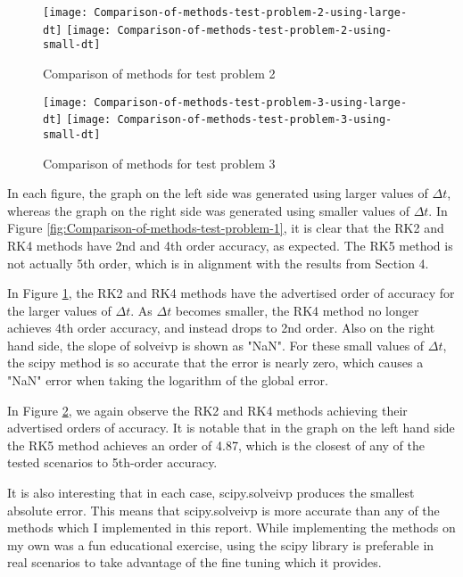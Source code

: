 \documentclass{article}
\begin{document}
\begin{figure}[H]
	\centering
	\texttt{[image: Comparison-of-methods-test-problem-2-using-large-dt]}
	\texttt{[image: Comparison-of-methods-test-problem-2-using-small-dt]}
	\caption{Comparison of methods for test problem 2}
	\label{fig:Comparison-of-methods-test-problem-2}
\end{figure}

\begin{figure}[H]
	\centering
	\texttt{[image: Comparison-of-methods-test-problem-3-using-large-dt]}
	\texttt{[image: Comparison-of-methods-test-problem-3-using-small-dt]}
	\caption{Comparison of methods for test problem 3}
	\label{fig:Comparison-of-methods-test-problem-3}
\end{figure}

In each figure, the graph on the left side was generated using larger values of $\Delta t$, whereas the graph on the right side was generated using smaller values of $\Delta t$.  In Figure \ref{fig:Comparison-of-methods-test-problem-1}, it is clear that the RK2 and RK4 methods have 2nd and 4th order accuracy, as expected.  The RK5 method is not actually 5th order, which is in alignment with the results from Section 4.

In Figure \ref{fig:Comparison-of-methods-test-problem-2}, the RK2 and RK4 methods have the advertised order of accuracy for the larger values of $\Delta t$.  As $\Delta t$ becomes smaller, the RK4 method no longer achieves 4th order accuracy, and instead drops to 2nd order.  Also on the right hand side, the slope of solve\textunderscore ivp is shown as "NaN".  For these small values of $\Delta t$, the scipy method is so accurate that the error is nearly zero, which causes a "NaN" error when taking the logarithm of the global error.

In Figure \ref{fig:Comparison-of-methods-test-problem-3}, we again observe the RK2 and RK4 methods achieving their advertised orders of accuracy.  It is notable that in the graph on the left hand side the RK5 method achieves an order of 4.87, which is the closest of any of the tested scenarios to 5th-order accuracy.

It is also interesting that in each case, scipy.solve\textunderscore ivp produces the smallest absolute error.  This means that scipy.solve\textunderscore ivp is more accurate than any of the methods which I implemented in this report.  While implementing the methods on my own was a fun educational exercise, using the scipy library is preferable in real scenarios to take advantage of the fine tuning which it provides.
\end{document}
